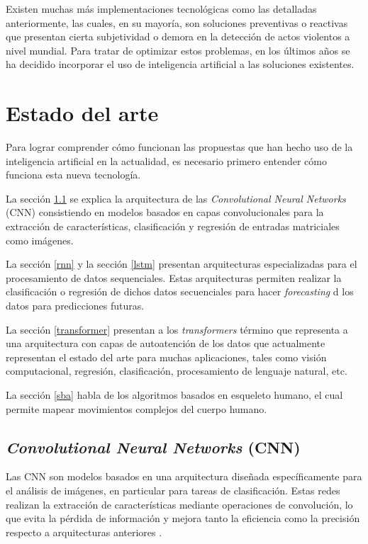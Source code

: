 Existen muchas más implementaciones tecnológicas como 
las detalladas anteriormente, las cuales, en su mayoría, 
son soluciones preventivas o reactivas que presentan cierta 
subjetividad o demora en la detección de actos violentos a 
nivel mundial. Para tratar de optimizar estos problemas, en 
los últimos años se ha decidido incorporar el uso de 
inteligencia artificial a las soluciones existentes. \\

\section{Estado del arte}\label{estadodelarte}

Para lograr comprender cómo funcionan las propuestas que 
han hecho uso de la inteligencia artificial en la actualidad, 
es necesario primero entender cómo funciona esta nueva 
tecnología.

La sección \ref{cnn} se explica la arquitectura de las 
\textit{Convolutional Neural Networks} (CNN) consistiendo en 
modelos basados en capas convolucionales para la extracción de 
características, clasificación y regresión de entradas matriciales 
como imágenes. 

La sección \ref{rnn} y la sección \ref{lstm} presentan arquitecturas 
especializadas para el procesamiento de datos sequenciales. Estas 
arquitecturas permiten realizar la clasificación o regresión de dichos 
datos secuenciales para hacer \textit{forecasting} d los datos para 
predicciones futuras. 

La sección \ref{transformer} presentan a los \textit{transformers} 
término que representa a una arquitectura 
con capas de autoatención de los datos que actualmente representan 
el estado del arte para muchas aplicaciones, tales como visión 
computacional, regresión, clasificación, procesamiento de lenguaje 
natural, etc.

La sección \ref{sba} habla de los algoritmos basados en esqueleto 
humano, el cual permite mapear movimientos complejos del cuerpo 
humano.

\subsection{\textit{Convolutional Neural Networks} (CNN)}\label{cnn}

Las CNN son modelos basados en una arquitectura diseñada 
específicamente para el análisis de imágenes, en particular 
para tareas de clasificación. Estas redes realizan la 
extracción de características mediante operaciones de 
convolución, lo que evita la pérdida de información y mejora 
tanto la eficiencia como la precisión respecto a arquitecturas 
anteriores \cite{Goodfellow-et-al-2016}.\\

